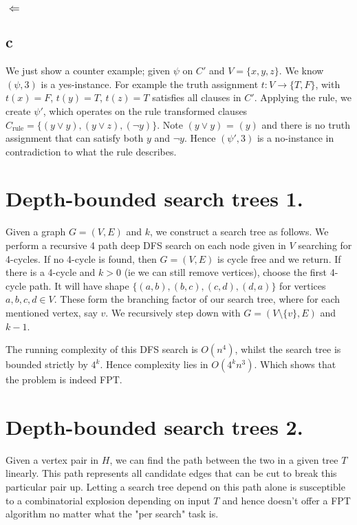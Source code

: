 \documentclass{article}
\begin{document}
\subsubsection*{$\Leftarrow$}

\subsection*{c}
We just show a counter example; given $\psi$ on $C'$ and $V = \{x,y,z\}$. We know $(\psi, 3)$ is a yes-instance. For example the truth assignment $t: V \rightarrow\{T,F\}$, with $t(x)=F$, $t(y)=T$, $t(z)=T$ satisfies all clauses in $C'$. Applying the rule, 
we create $\psi'$, which operates on the rule transformed clauses $C_{\text{rule}}=\{(y \lor y), (y \lor z), (\lnot y)\}$. Note $(y \lor y)$ = $(y)$ and there is no truth assignment that can satisfy both $y$ and $\lnot y$. Hence $(\psi', 3)$ is a no-instance in contradiction to what the rule describes.

\section*{Depth-bounded search trees 1.}
Given a graph $G = (V, E)$ and $k$, we construct a search tree as follows. We perform a recursive 4 path deep DFS search on each node given in $V$ searching for 4-cycles. If no 4-cycle is found, then $G = (V,E)$ is cycle free and we return. If there is a 4-cycle and $k > 0$ (ie we can still remove vertices), choose the first 4-cycle path. It will have shape $\{(a,b), (b,c), (c,d), (d,a)\}$ for vertices $a,b,c,d \in V$. These form the branching factor of our search tree, where for each mentioned vertex, say $v$. We recursively step down with $G = (V \setminus \{v\}, E)$ and $k-1$.

The running complexity of this DFS search is $O(n^4)$, whilst the search tree is bounded strictly by $4^k$. Hence complexity lies in $O(4^{k}n^3)$. Which shows that the problem is indeed FPT.

\section*{Depth-bounded search trees 2.}
Given a vertex pair in $H$, we can find the path between the two in a given tree $T$ linearly. This path represents all candidate edges that can be cut to break this particular pair up. Letting a search tree depend on this path alone is susceptible to a combinatorial explosion depending on input $T$ and hence doesn't offer a FPT algorithm no matter what the "per search" task is. 
\end{document}
